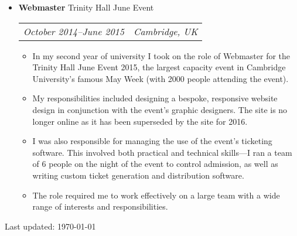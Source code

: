 \documentclass[letterpaper]{article}
\def\footerlink{}
\begin{document}
\begin{itemize}
    \item \textbf{Webmaster} Trinity Hall June Event \\
        \begin{tabular}{c|c}
            \emph{October 2014--June 2015} & \emph{Cambridge, UK}
        \end{tabular}
        \begin{itemize}
            \item In my second year of university I took on the role of
                Webmaster for the Trinity Hall June Event 2015, the largest
                capacity event in Cambridge University's famous May Week (with
                2000 people attending the event).
            \item My responsibilities included designing a bespoke, responsive
                website design in conjunction with the event's graphic
                designers. The site is no longer online as it has been
                superseded by the site for 2016.
            \item I was also responsible for managing the use of the event's
                ticketing software. This involved both practical and technical
                skills---I ran a team of 6 people on the night of the event to
                control admission, as well as writing custom ticket generation
                and distribution software.
            \item The role required me to work effectively on a large team with
                a wide range of interests and responsibilities.
        \end{itemize}

\end{itemize}

\begin{center}
  \begin{footnotesize}
    Last updated: \today \\
    \href{\footerlink}{\texttt{\footerlink}}
  \end{footnotesize}
\end{center}
\end{document}
